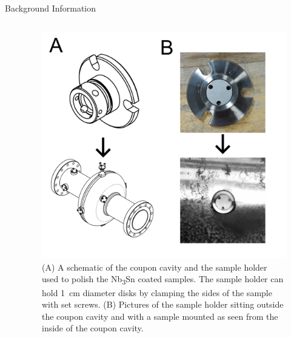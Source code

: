 \documentclass{beamer}
\begin{document}
\begin{frame}{}
\begin{columns}[t]
\begin{column}{0.32\linewidth}
\begin{block}{\label{sec:backgroundinformation}Background Information}
\begin{columns}[t]
\begin{column}{0.45\columnwidth}
\begin{itemize}
                            \end{itemize}  
                        \end{column}
                        \begin{column}{0.45\columnwidth}
                            \begin{figure}[t]%
                                \centering%
                                \includegraphics[width=\columnwidth]{../doc/figs/Coupon_Cavity.png}%
                                \caption{(A) A schematic of the coupon cavity and the sample holder used to polish the Nb\textsubscript{3}Sn coated samples. The sample holder can hold 1~cm diameter disks by clamping the sides of the sample with set screws. (B) Pictures of the sample holder sitting outside the coupon cavity and with a sample mounted as seen from the inside of the coupon cavity.}%
                                \label{fig:couponcavity}%
                            \end{figure}
                        \end{column}
                    \end{columns}
                \end{block}
            \end{column}






\end{columns}
\end{frame}
\end{document}
